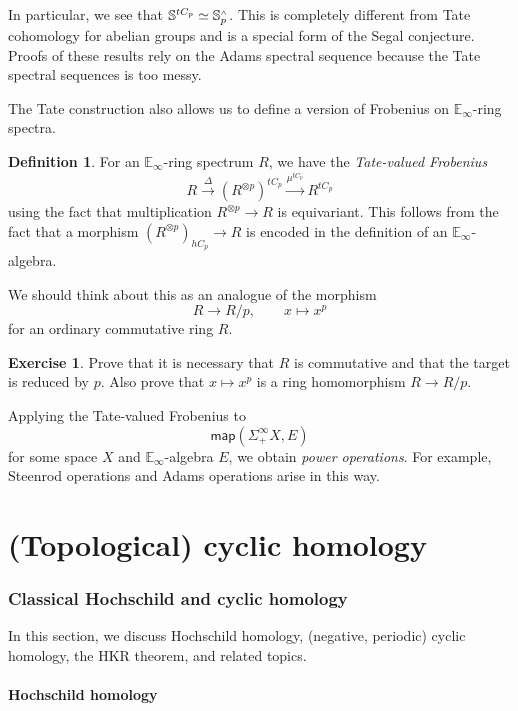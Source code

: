 \documentclass[10pt]{amsart}
\theoremstyle{definition}
\newtheorem{defn}[thm]{Definition}
\newtheorem{exer}[thm]{Exercise}
\theoremstyle{remark}
\theoremstyle{plain}
\theoremstyle{definition}
\theoremstyle{remark}
\newcommand{\E}{\mathbb{E}}
\newcommand{\bS}{\mathbb{S}}
\newcommand{\ms}[1]{\mathsf{#1}}
\newcommand{\1}{\mathbf{1}}
\newcommand{\2}{\mathbf{2}}
\newcommand{\3}{\mathbf{3}}
\newcommand{\sw}{\mathsmaller{\wedge}}
\begin{document}
In particular, we see that $\bS^{t C_p} \simeq \bS_p^{\sw}$. This is completely different from Tate cohomology for abelian groups and is a special form of the Segal conjecture. Proofs of these results rely on the Adams spectral sequence because the Tate spectral sequences is too messy.

The Tate construction also allows us to define a version of Frobenius on $\E_{\infty}$-ring spectra.
\begin{defn}
    For an $\E_{\infty}$-ring spectrum $R$, we have the \textit{Tate-valued Frobenius}
    \[ R \xrightarrow{\Delta} (R^{\otimes p})^{t C_p} \xrightarrow{\mu^{t C_p}} R^{t C_p} \]
    using the fact that multiplication $R^{\otimes p} \to R$ is equivariant. This follows from the fact that a morphism $(R^{\otimes p})_{h C_p} \to R$ is encoded in the definition of an $\E_{\infty}$-algebra.
\end{defn}

We should think about this as an analogue of the morphism
\[ R \to R/p, \qquad x \mapsto x^p \]
for an ordinary commutative ring $R$.

\begin{exer}
    Prove that it is necessary that $R$ is commutative and that the target is reduced by $p$. Also prove that $x \mapsto x^p$ is a ring homomorphism $R \to R/p$.
\end{exer}

Applying the Tate-valued Frobenius to
\[ \ms{map}(\Sigma_+^{\infty} X, E) \]
for some space $X$ and $\E_{\infty}$-algebra $E$, we obtain \textit{power operations}. For example, Steenrod operations and Adams operations arise in this way.



\part{(Topological) cyclic homology}
\section{Classical Hochschild and cyclic homology}%
\label{sec:Classical Hochschild and cyclic homology}

In this section, we discuss Hochschild homology, (negative, periodic) cyclic homology, the HKR theorem, and related topics.

\subsection{Hochschild homology}%
\label{sub:Hochschild homology}
\end{document}
